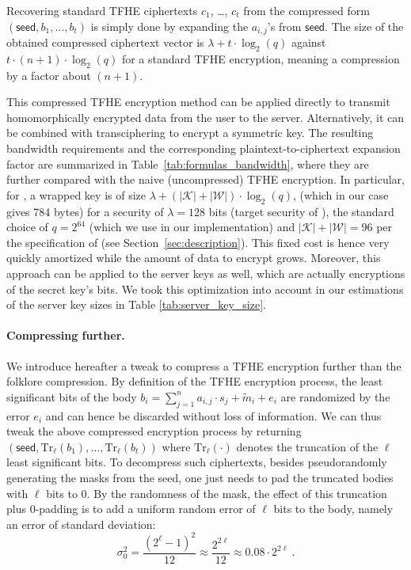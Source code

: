 \smallskip

Recovering standard \gls{TFHE} ciphertexts $c_1$, \ldots, $c_t$ from the compressed form $(\mathsf{seed}, b_1, \ldots, b_t)$ is simply done by expanding the $a_{i,j}$'s from $\mathsf{seed}$. The size of the obtained compressed ciphertext vector is $\lambda + t \cdot \log_2(q)$ against $t \cdot (n+1) \cdot \log_2(q)$ for a standard \gls{TFHE} encryption, meaning a compression by a factor about $(n+1)$. 

This compressed \gls{TFHE} encryption method can be applied directly to transmit homomorphically encrypted data from the user to the server. Alternatively, it can be combined with transciphering to encrypt a symmetric key. The resulting bandwidth requirements and the corresponding plaintext-to-ciphertext expansion factor are summarized in Table~\ref{tab:formulas_bandwidth}, where they are further compared with the naive (uncompressed) \gls{TFHE} encryption. In particular, for \coolName, a wrapped key is of size $\lambda + (|\mathcal K| + |\mathcal W|) \cdot \log_2(q)$, (which in our case gives 784 bytes) for a security of $\lambda = 128$ bits (target security of \coolName), the standard choice of $q= 2^{64}$ (which we use in our implementation) and $|\mathcal K| + |\mathcal W| = 96$ per the specification of \coolName (see Section~\ref{sec:description}). This fixed cost is hence very quickly amortized while the amount of data to encrypt grows.
Moreover, this approach can be applied to the server keys as well, which are actually encryptions of the secret key's bits. We took this optimization into account in our estimations of the server key sizes in Table \ref{tab:server_key_size}. 

\paragraph{Compressing further.}

We introduce hereafter a tweak to compress a \gls{TFHE} encryption further than the folklore compression. By definition of the \gls{TFHE} encryption process, the least significant bits of the body $b_i = \sum_{j=1}^n a_{i,j} \cdot s_j + \tilde{m}_i + e_i$ are randomized by the error $e_i$ and can hence be discarded without loss of information. We can thus tweak the above compressed encryption process by returning $(\mathsf{seed}, \mathrm{Tr}_\ell(b_1), \ldots, \mathrm{Tr}_\ell(b_t))$ where $\mathrm{Tr}_\ell(\cdot)$ denotes the truncation of the $\ell$ least significant bits. To decompress such ciphertexts, besides pseudorandomly generating the masks from the seed, one just needs to pad the truncated bodies with $\ell$ bits to $0$. By the randomness of the mask, the effect of this truncation plus $0$-padding is to add a uniform random error of $\ell$ bits to the body, namely an error of standard deviation: 
$$\sigma_0^2  = \frac{(2^\ell - 1)^2}{12} \approx \frac{2^{2\ell}}{12} \approx 0.08 \cdot 2^{2\ell} ~.$$

